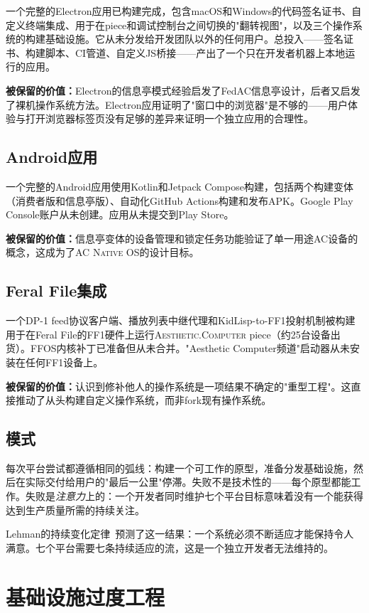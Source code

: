 \documentclass[10pt,letterpaper,twocolumn]{article}
\newcommand{\ac}{\textsc{Aesthetic.Computer}}
\newcommand{\acos}{\textsc{AC Native OS}}
\begin{document}
一个完整的Electron应用已构建完成，包含macOS和Windows的代码签名证书、自定义终端集成、用于在piece和调试控制台之间切换的"翻转视图"，以及三个操作系统的构建基础设施。它从未分发给开发团队以外的任何用户。总投入——签名证书、构建脚本、CI管道、自定义JS桥接——产出了一个只在开发者机器上本地运行的应用。

\textbf{被保留的价值：}Electron的信息亭模式经验启发了FedAC信息亭设计，后者又启发了裸机操作系统方法。Electron应用证明了"窗口中的浏览器"是不够的——用户体验与打开浏览器标签页没有足够的差异来证明一个独立应用的合理性。

\subsection{Android应用}

一个完整的Android应用使用Kotlin和Jetpack Compose构建，包括两个构建变体（消费者版和信息亭版）、自动化GitHub Actions构建和发布APK。Google Play Console账户从未创建。应用从未提交到Play Store。

\textbf{被保留的价值：}信息亭变体的设备管理和锁定任务功能验证了单一用途AC设备的概念，这成为了\acos{}的设计目标。

\subsection{Feral File集成}

一个DP-1 feed协议客户端、播放列表中继代理和KidLisp-to-FF1投射机制被构建用于在Feral File的FF1硬件上运行\ac{} piece（约25台设备出货）。FFOS内核补丁已准备但从未合并。"Aesthetic Computer频道"启动器从未安装在任何FF1设备上。

\textbf{被保留的价值：}认识到修补他人的操作系统是一项结果不确定的"重型工程"。这直接推动了从头构建自定义操作系统，而非fork现有操作系统。

\subsection{模式}

每次平台尝试都遵循相同的弧线：构建一个可工作的原型，准备分发基础设施，然后在实际交付给用户的"最后一公里"停滞。失败不是技术性的——每个原型都能工作。失败是\emph{注意力}上的：一个开发者同时维护七个平台目标意味着没有一个能获得达到生产质量所需的持续关注。

Lehman的持续变化定律~\citep{lehman1980programs}预测了这一结果：一个系统必须不断适应才能保持令人满意。七个平台需要七条持续适应的流，这是一个独立开发者无法维持的。

\section{基础设施过度工程}
\end{document}
